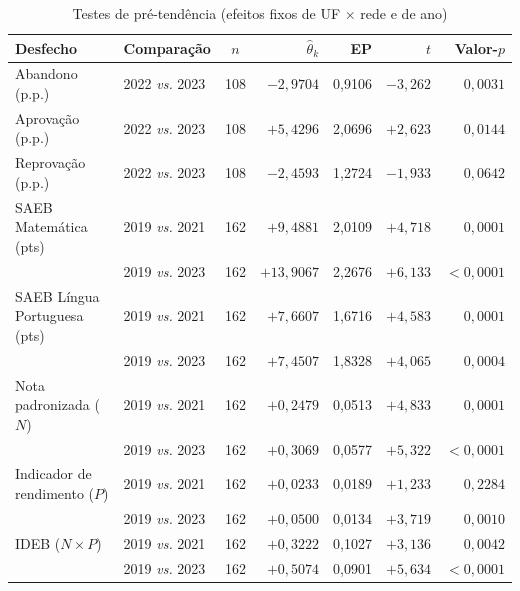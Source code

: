 \begin{table}[!htb]
    \centering
    \caption{Testes de pré-tendência (efeitos fixos de UF $\times$ rede e de ano)}
    \label{tab_pretendencia}
    \small
    \begin{tabular}{llcrrrr}
        \toprule
        \textbf{Desfecho} & \textbf{Comparação} & \textbf{$n$} & \textbf{$\hat{\theta}_k$} & \textbf{EP} & \textbf{$t$} & \textbf{Valor-$p$} \\
        \midrule
        Abandono (p.p.)              & 2022 \textit{vs.} 2023 & 108 & $-2{,}9704$ & 0,9106 & $-3{,}262$ & $0{,}0031$ \\
        Aprovação (p.p.)             & 2022 \textit{vs.} 2023 & 108 & $+5{,}4296$ & 2,0696 & $+2{,}623$ & $0{,}0144$ \\
        Reprovação (p.p.)            & 2022 \textit{vs.} 2023 & 108 & $-2{,}4593$ & 1,2724 & $-1{,}933$ & $0{,}0642$ \\
        \addlinespace
        SAEB Matemática (pts)        & 2019 \textit{vs.} 2021 & 162 & $+9{,}4881$  & 2,0109 & $+4{,}718$ & $0{,}0001$ \\
                                     & 2019 \textit{vs.} 2023 & 162 & $+13{,}9067$ & 2,2676 & $+6{,}133$ & $<0{,}0001$ \\
        SAEB Língua Portuguesa (pts) & 2019 \textit{vs.} 2021 & 162 & $+7{,}6607$  & 1,6716 & $+4{,}583$ & $0{,}0001$ \\
                                     & 2019 \textit{vs.} 2023 & 162 & $+7{,}4507$  & 1,8328 & $+4{,}065$ & $0{,}0004$ \\
        Nota padronizada ($N$)       & 2019 \textit{vs.} 2021 & 162 & $+0{,}2479$  & 0,0513 & $+4{,}833$ & $0{,}0001$ \\
                                     & 2019 \textit{vs.} 2023 & 162 & $+0{,}3069$  & 0,0577 & $+5{,}322$ & $<0{,}0001$ \\
        Indicador de rendimento ($P$) & 2019 \textit{vs.} 2021 & 162 & $+0{,}0233$ & 0,0189 & $+1{,}233$ & $0{,}2284$ \\
                                     & 2019 \textit{vs.} 2023 & 162 & $+0{,}0500$  & 0,0134 & $+3{,}719$ & $0{,}0010$ \\
        IDEB ($N \times P$)          & 2019 \textit{vs.} 2021 & 162 & $+0{,}3222$  & 0,1027 & $+3{,}136$ & $0{,}0042$ \\
                                     & 2019 \textit{vs.} 2023 & 162 & $+0{,}5074$  & 0,0901 & $+5{,}634$ & $<0{,}0001$ \\
        \bottomrule
    \end{tabular}
\end{table}

